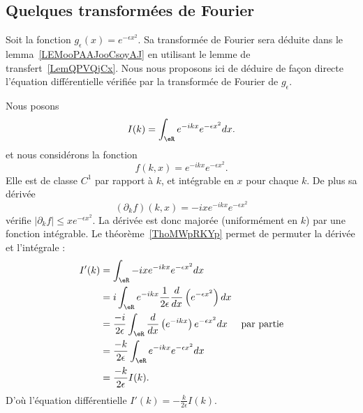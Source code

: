 \subsection{Quelques transformées de Fourier}

\begin{example} \label{EXooLMXKooFcAZGR}
    Soit la fonction \( g_{\epsilon}(x)= e^{-\epsilon x^2}\). Sa transformée de Fourier sera déduite dans le lemma~\ref{LEMooPAAJooCsoyAJ} en utilisant le lemme de transfert~\ref{LemQPVQjCx}. Nous nous proposons ici de déduire de façon directe l'équation différentielle vérifiée par la transformée de Fourier de \( g_{\epsilon}\).

    Nous posons
    \begin{equation}
        I(k)=\int_{\eR} e^{-ikx} e^{-\epsilon x^2}dx.
    \end{equation}
    et nous considérons la fonction
    \begin{equation}
        f(k,x)= e^{-ikx} e^{-\epsilon x^2}.
    \end{equation}
    Elle est de classe \( C^1\) par rapport à \( k\), et intégrable en \( x\) pour chaque \( k\). De plus sa dérivée
    \begin{equation}
        (\partial_k f)(k,x)=-ix e^{-ikx} e^{-\epsilon x^2}
    \end{equation}
    vérifie \( | \partial_kf |\leq x e^{-\epsilon x^2}\). La dérivée est donc majorée (uniformément en \( k\)) par une fonction intégrable. Le théorème~\ref{ThoMWpRKYp} permet de permuter la dérivée et l'intégrale :
    \begin{subequations}
        \begin{align}
            I'(k)&=\int_{\eR}-ix e^{-ikx} e^{-\epsilon x^2}dx\\
            &=i\int_{\eR} e^{-ikx}\frac{1}{ 2\epsilon } \frac{ d  }{ dx }\left(  e^{-\epsilon x^2} \right)dx\\
            &=\frac{ -i }{ 2\epsilon }\int_{\eR}\frac{ d }{ dx }\left(  e^{-ikx} \right) e^{-\epsilon x^2}dx     &\text{par partie}\\
            &=\frac{ -k }{ 2\epsilon }\int_{\eR} e^{-ikx} e^{-\epsilon x^2}dx\\
            &=\frac{ -k }{ 2\epsilon }I(k).
        \end{align}
    \end{subequations}
    D'où l'équation différentielle \( I'(k)=-\frac{ k }{ 2\epsilon }I(k)\).
\end{example}

